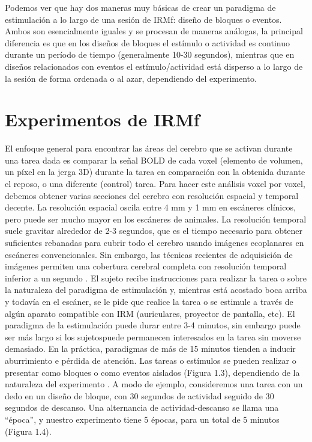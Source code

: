 \documentclass[12pt,a5,twoside]{book}
\begin{document}
Podemos ver que hay dos maneras muy básicas de crear un paradigma de estimulación a lo largo de una sesión de IRMf: diseño de bloques o eventos. Ambos son esencialmente iguales y se procesan de maneras análogas, la principal diferencia es que en los diseños de bloques el estímulo o actividad es continuo durante un período de tiempo (generalmente 10-30 segundos), mientras que en diseños relacionados con eventos el estímulo/actividad está disperso a lo largo de la sesión de forma ordenada o al azar, dependiendo del experimento.

\section{Experimentos de IRMf}

El enfoque general para encontrar las áreas del cerebro que se activan durante una tarea dada es comparar la señal BOLD de cada voxel (elemento de volumen, un píxel en la jerga 3D) durante la tarea en comparación con la obtenida durante el reposo, o una diferente (control) tarea. Para hacer este análisis voxel por voxel, debemos obtener varias secciones del cerebro con resolución espacial y temporal decente. La resolución espacial oscila entre 4 mm y 1 mm en escáneres clínicos, pero puede ser mucho mayor en los escáneres de animales. La resolución temporal suele gravitar alrededor de 2-3 segundos, que es el tiempo necesario para obtener suficientes rebanadas para cubrir todo el cerebro usando imágenes ecoplanares en escáneres convencionales. Sin embargo, las técnicas recientes de adquisición de imágenes permiten una cobertura cerebral completa con resolución temporal inferior a un segundo \citep{Candes_2006}. El sujeto recibe instrucciones para realizar la tarea o sobre la naturaleza del paradigma de estimulación y, mientras está acostado boca arriba y todavía en el escáner, se le pide que realice la tarea o se estimule a través de algún aparato compatible con IRM (auriculares, proyector de pantalla, etc). El paradigma de la estimulación puede durar entre 3-4 minutos, sin embargo puede ser más largo si los sujetospuede permanecen interesados en la tarea sin moverse demasiado. En la práctica, paradigmas de más de 15 minutos tienden a inducir aburrimiento e pérdida de atención. Las tareas o estímulos se pueden realizar o presentar como bloques o como eventos aislados (Figura 1.3), dependiendo de la naturaleza del experimento \citep{Amaro_2006}. A modo de ejemplo, consideremos una tarea con un dedo en un diseño de bloque, con 30 segundos de actividad seguido de 30 segundos de descanso. Una alternancia de actividad-descanso se llama una ``época'', y nuestro experimento tiene 5 épocas, para un total de 5 minutos (Figura 1.4).
\end{document}
